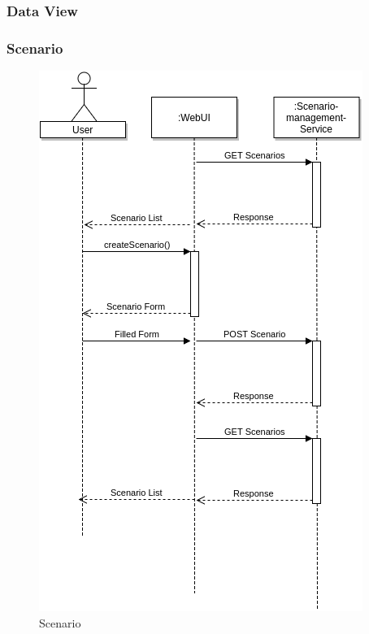 \subsubsection{Data View}


\subsubsection{Scenario}
\begin{figure}[H]
	\centering\includegraphics[width=.65\textwidth]{res/Scenario}
	\caption{Scenario}
	\label{fig:scenario}
\end{figure}


